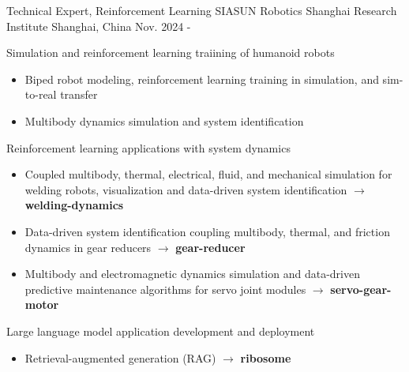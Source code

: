 \documentclass[../cv.tex]{subfiles}
\begin{document}


\begin{cventries}


	\cventry
	{Technical Expert, Reinforcement Learning} %
	{SIASUN Robotics Shanghai Research Institute} %
	{Shanghai, China} %
	{Nov. 2024 - } %
	{
		\begin{cvitems}
			\item Simulation and reinforcement learning traiining of humanoid robots
			\begin{itemize}
				\item Biped robot modeling, reinforcement learning training in simulation, and sim-to-real transfer
				\item Multibody dynamics simulation and system identification
			\end{itemize}
			\item Reinforcement learning applications with system dynamics
			\begin{itemize}
				\item Coupled multibody, thermal, electrical, fluid, and mechanical simulation for welding robots, visualization and data-driven system identification $\rightarrow$ \textbf{welding-dynamics} \href{https://gitlab.com/siasunx1/welding-dynamics/}{\faGitlab}
				\item Data-driven system identification coupling multibody, thermal, and friction dynamics in gear reducers $\rightarrow$ \textbf{gear-reducer} \href{https://gitlab.com/siasunx1/gear-reducer/}{\faGitlab}
				\item Multibody and electromagnetic dynamics simulation and data-driven predictive maintenance algorithms for servo joint modules $\rightarrow$ \textbf{servo-gear-motor} \href{https://gitlab.com/siasunx1/servo-gear-motor/}{\faGitlab}
			\end{itemize}
			\item Large language model application development and deployment
			\begin{itemize}
				\item Retrieval-augmented generation (RAG) $\rightarrow$ \textbf{ribosome} \href{https://gitlab.com/Binjian/ribosome}{\faGitlab}

\end{itemize}
\end{cvitems}}
\end{cventries}
\end{document}
